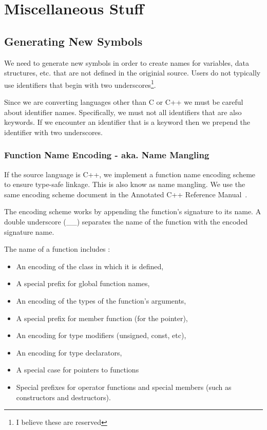 
\section{Miscellaneous Stuff}

\subsection{Generating New Symbols}

We need to generate new symbols in order to create names for
variables, data structures, etc. that are not defined in the originial
source.  Users do not typically use identifiers that begin with two
underscores\footnote{I believe these are reserved}.

Since we are converting languages other than C or C++ we must be
careful about identifier names.  Specifically, we must not all
identifiers that are also keywords.  If we encounter an identifier
that is a keyword then we prepend the identifier with two underscores.

\subsubsection{Function Name Encoding - aka. Name Mangling}

If the source language is C++, we implement a function name encoding
scheme to ensure type-safe linkage.  This is also know as name
mangling.  We use the same encoding scheme document in the Annotated
C++ Reference Manual~\cite{ellis:90}.

The encoding scheme works by appending the function's signature
to its name.  A double underscore (\_\_) separates the name
of the function with the encoded signature name.

The name of a function includes :
\begin{itemize}
\item An encoding of the class in which it is defined,
\item A special prefix for global function names,
\item An encoding of the types of the function's arguments,
\item A special prefix for member function (for the  pointer),
\item An encoding for type modifiers (\ie unsigned, const, etc),
\item An encoding for type declarators,
\item A special case for pointers to functions
\item Special prefixes for operator functions and special members
(such as constructors and destructors).
\end{itemize}

